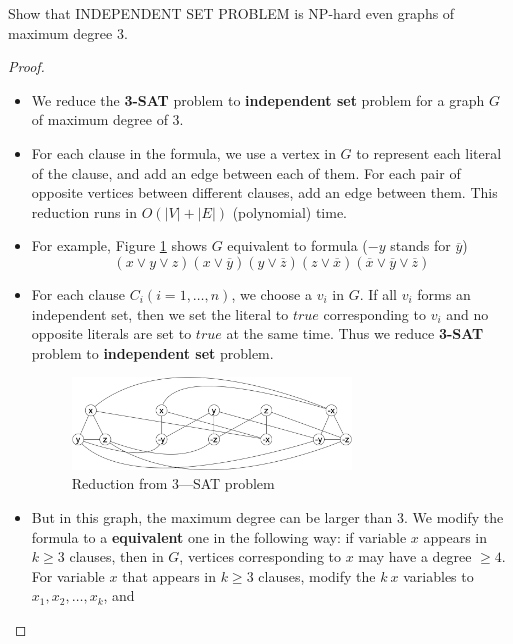 \documentclass{article}
\newcounter{exercise}
\newcommand{\<}{
    \langle}
\renewcommand{\>}{
    \rangle}
\begin{document}
{\begin{exercise}
Show that \textsf{INDEPENDENT SET PROBLEM} is NP-hard even graphs of maximum degree $3$.
\end{exercise}
\begin{proof}
    \leavevmode\newline
    \begin{itemize}
        \item We reduce the \textbf{3-SAT} problem to \textbf{independent set} problem for a graph $G$ of maximum degree of $3$.
        \item For each clause in the formula, we use a vertex in $G$ to represent each literal of the clause, and add an edge between each of them. For each pair of opposite vertices between different clauses, add an edge between them. This reduction runs in $O(|V|+|E|)$ (polynomial) time.
        \item For example, Figure \ref{fig:eee} shows $G$ equivalent to formula ($-y$ stands for $\overline{y}$)
        \begin{displaymath}
            (x\vee y \vee z)(x \vee \overline{y})(y \vee \overline{z})(z \vee \overline{x})(\overline{x} \vee \overline{y} \vee \overline{z})
        \end{displaymath}
        \item For each clause $C_i(i=1,\ldots,n)$, we choose a $v_i$ in $G$. If all $v_i$ forms an independent set, then we set the literal to $true$ corresponding to $v_i$ and no opposite literals are set to $true$ at the same time. Thus we reduce \textbf{3-SAT} problem to \textbf{independent set} problem. 
        \begin{figure}[!htp]
            \centering
            \includegraphics[width=0.7\textwidth]{img/5.jpg}
            \caption{Reduction from 3—SAT problem}
            \label{fig:eee}
          \end{figure}
        \item But in this graph, the maximum degree can be larger than $3$. We modify the formula to a \textbf{equivalent} one in the following way: if variable $x$ appears in $k\geq 3$ clauses, then in $G$, vertices corresponding to $x$ may have a degree $\geq 4$. For variable $x$ that appears in $k\geq 3$ clauses, modify the $k\ x$ variables to $x_1,x_2,\ldots,x_k$, and

\end{itemize}
\end{proof}}
\end{document}
